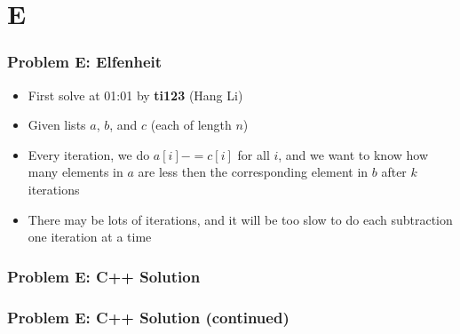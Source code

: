 \section{E}%
\label{sec:e}

\begin{frame}
  \frametitle{Problem E: Elfenheit}
  \begin{itemize}
    \item First solve at 01:01 by \textbf{ti123} (Hang Li)
    \item Given lists $a$, $b$, and $c$ (each of length $n$)
    \item Every iteration, we do $a[i] -= c[i]$ for all $i$, and we want to know how many elements in $a$
      are less then the corresponding element in $b$ after $k$ iterations
    \item There may be lots of iterations, and it will be too slow to do each subtraction one
      iteration at a time
  \end{itemize}
\end{frame}

\begin{frame}
  \frametitle{Problem E: C++ Solution}
\end{frame}
\begin{frame}
  \frametitle{Problem E: C++ Solution (continued)}
\end{frame}
